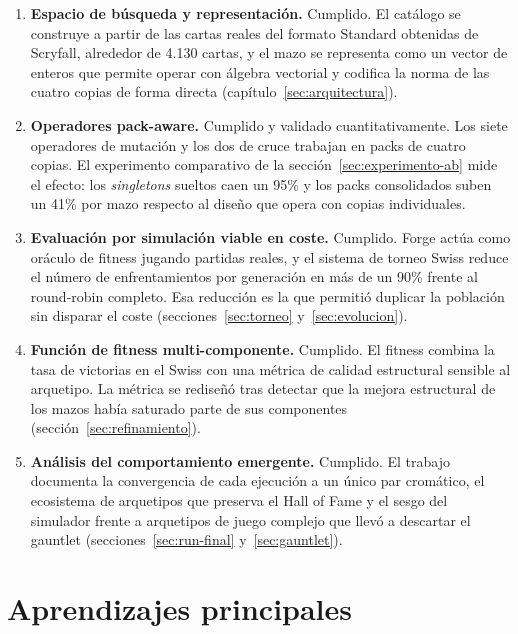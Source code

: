 \begin{enumerate}
    \item \textbf{Espacio de búsqueda y representación.} Cumplido. El catálogo se construye a partir de las cartas reales del formato Standard obtenidas de Scryfall, alrededor de 4.130 cartas, y el mazo se representa como un vector de enteros que permite operar con álgebra vectorial y codifica la norma de las cuatro copias de forma directa (capítulo~\ref{sec:arquitectura}).

    \item \textbf{Operadores pack-aware.} Cumplido y validado cuantitativamente. Los siete operadores de mutación y los dos de cruce trabajan en packs de cuatro copias. El experimento comparativo de la sección~\ref{sec:experimento-ab} mide el efecto: los \emph{singletons} sueltos caen un 95\% y los packs consolidados suben un 41\% por mazo respecto al diseño que opera con copias individuales.

    \item \textbf{Evaluación por simulación viable en coste.} Cumplido. Forge actúa como oráculo de fitness jugando partidas reales, y el sistema de torneo Swiss reduce el número de enfrentamientos por generación en más de un 90\% frente al round-robin completo. Esa reducción es la que permitió duplicar la población sin disparar el coste (secciones~\ref{sec:torneo} y~\ref{sec:evolucion}).

    \item \textbf{Función de fitness multi-componente.} Cumplido. El fitness combina la tasa de victorias en el Swiss con una métrica de calidad estructural sensible al arquetipo. La métrica se rediseñó tras detectar que la mejora estructural de los mazos había saturado parte de sus componentes (sección~\ref{sec:refinamiento}).

    \item \textbf{Análisis del comportamiento emergente.} Cumplido. El trabajo documenta la convergencia de cada ejecución a un único par cromático, el ecosistema de arquetipos que preserva el Hall of Fame y el sesgo del simulador frente a arquetipos de juego complejo que llevó a descartar el gauntlet (secciones~\ref{sec:run-final} y~\ref{sec:gauntlet}).
\end{enumerate}

\section{Aprendizajes principales}

